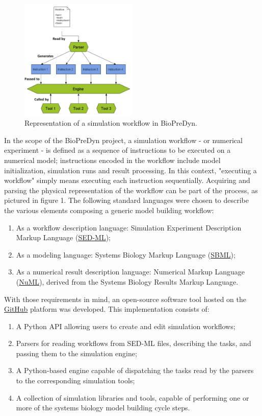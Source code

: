 \documentclass{llncs}
\begin{document}
\begin{figure}[!hbtp]
  \centering
  \includegraphics[width=0.5\textwidth]{proposal_complete}
  \caption{Representation of a simulation workflow in BioPreDyn.}
\end{figure}
In the scope of the BioPreDyn project, a simulation workflow - or
numerical experiment - is defined as a sequence of instructions to be executed
on a numerical model; instructions encoded in the workflow include model
initialization, simulation runs and result processing. In this context,
"executing a workflow" simply means executing each instruction sequentially.
Acquiring and parsing the physical representation of the workflow can be part
of the process, as pictured in figure 1. The following standard languages were
chosen to describe the various elements composing a generic model building
workflow:
\begin{enumerate}
\item As a workflow description language: Simulation Experiment Description
Markup Language (\href{http://sed-ml.org/}{SED-ML});
\item As a modeling language: Systems Biology Markup Language
(\href{http://sbml.org}{SBML});
\item As a numerical result description language: Numerical Markup Language
(\href{http://code.google.com/p/numl/}{NuML}), derived from the Systems Biology
Results Markup Language.
\end{enumerate}
With those requirements in mind, an open-source software tool hosted on the
\href{http://www.github.com/bmoreau/biopredyn}{GitHub} platform was developed.
This implementation consists of:
\begin{enumerate}
\item A Python API allowing users to create and edit simulation workflows;
\item Parsers for reading workflows from SED-ML files, describing the tasks,
and passing them to the simulation engine;
\item A Python-based engine capable of dispatching the tasks read by the parsers
to the corresponding simulation tools;
\item A collection of simulation libraries and tools, capable of performing one
or more of the systems biology model building cycle steps.
\end{enumerate}
\end{document}
